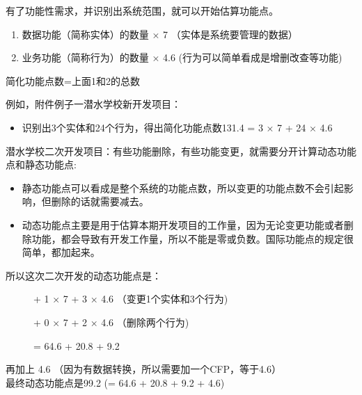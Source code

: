 有了功能性需求，并识别出系统范围，就可以开始估算功能点。

\begin{enumerate}
\tightlist
\item
  数据功能（简称实体）的数量 × 7 （实体是系统要管理的数据）
\item
  业务功能（简称行为）的数量 × 4.6 (行为可以简单看成是增删改查等功能)
\end{enumerate}

\begin{description}
\tightlist
\item[]
简化功能点数=上面1和2的总数
\end{description}

例如，附件例子一潜水学校新开发项目：

\begin{itemize}
\tightlist
\item
  识别出3个实体和24个行为，得出简化功能点数131.4 = 3 × 7 + 24 × 4.6
\end{itemize}

潜水学校二次开发项目：有些功能删除，有些功能变更，就需要分开计算动态功能点和静态功能点:

\begin{itemize}
\tightlist
\item
  静态功能点可以看成是整个系统的功能点数，所以变更的功能点数不会引起影响，但删除的话就需要减去。
\item
  动态功能点主要是用于估算本期开发项目的工作量，因为无论变更功能或者删除功能，都会导致有开发工作量，所以不能是零或负数。国际功能点的规定很简单，都加起来。
\end{itemize}

所以这次二次开发的动态功能点是：

\begin{description}
\item[]

+ 1 × 7 + 3 × 4.6 （变更1个实体和3个行为)

+ 0 × 7 + 2 × 4.6 （删除两个行为)

= 64.6 + 20.8 + 9.2
\end{description}

再加上 4.6 （因为有数据转换，所以需要加一个CFP，等于4.6）\\
最终动态功能点是99.2 (= 64.6 + 20.8 + 9.2 + 4.6)

